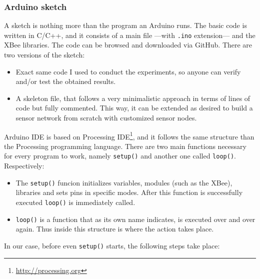 \subsubsection{Arduino sketch}
\label{subsub:arduinosketch}
A sketch is nothing more than the program an Arduino runs. The basic code is written in C/C++, and it consists of a main file ---with \texttt{.ino} extension--- and the XBee\textregistered{} libraries. The code can be browsed and downloaded via GitHub. There are two versions of the sketch:

\begin{itemize}
    \item Exact same code I used to conduct the experiments, so anyone can verify and/or test the obtained results.
    \item A skeleton file, that follows a very minimalistic approach in terms of lines of code but fully commented. This way, it can be extended as desired to build a sensor network from scratch with customized sensor nodes.
\end{itemize}

Arduino IDE is based on Processing IDE\footnote{\url{http://processing.org}}, and it follows the same structure than the Processing programming language. There are two main functions necessary for every program to work, namely \texttt{setup()} and another one called \texttt{loop()}. Respectively:

\begin{itemize}
    \item The \texttt{setup()} funcion initializes variables, modules (such as the XBee), libraries and sets pins in specific modes. After this function is successfully executed \texttt{loop()} is immediately called.
    \item \texttt{loop()} is a function that as its own name indicates, is executed over and over again. Thus inside this structure is where the action takes place. 
\end{itemize}

In our case, before even \texttt{setup()} starts, the following steps take place:

